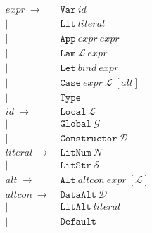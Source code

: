 \newcommand{\CVar}{\texttt{Var}}
\newcommand{\CLit}{\texttt{Lit}}
\newcommand{\CApp}{\texttt{App}}
\newcommand{\CLam}{\texttt{Lam}}
\newcommand{\CLet}{\texttt{Let}}
\newcommand{\CCase}{\texttt{Case}}
\newcommand{\CType}{\texttt{Type}}
\newcommand{\CLocal}{\texttt{Local}}
\newcommand{\CGlobal}{\texttt{Global}}
\newcommand{\CConstructor}{\texttt{Constructor}}
\newcommand{\CLitNum}{\texttt{LitNum}}
\newcommand{\CLitStr}{\texttt{LitStr}}
\newcommand{\CAlt}{\texttt{Alt}}
\newcommand{\CDataAlt}{\texttt{DataAlt}}
\newcommand{\CLitAlt}{\texttt{LitAlt}}
\newcommand{\CDefault}{\texttt{Default}}
\newcommand{\CNonRec}{\texttt{NonRec}}
\newcommand{\CRec}{\texttt{Rec}}
\newcommand{\CBind}{\texttt{Bind}}

\begin{figure}
  \begin{equation*}
    \begin{split}
      expr\    \rightarrow\ & \CVar\ id                          \\
                         |\ & \CLit\ literal                     \\
                         |\ & \CApp\ expr\ expr                  \\
                         |\ & \CLam\ \mathcal{L}\ expr           \\
                         |\ & \CLet\ bind\ expr                  \\
                         |\ & \CCase\ expr\ \mathcal{L}\ [alt]   \\
                         |\ & \CType                             \\
      id\      \rightarrow\ & \CLocal\       \mathcal{L}         \\
                         |\ & \CGlobal\      \mathcal{G}         \\
                         |\ & \CConstructor\ \mathcal{D}         \\
      literal\ \rightarrow\ & \CLitNum\ \mathcal{N}              \\
                         |\ & \CLitStr\ \mathcal{S}              \\
      alt\     \rightarrow\ & \CAlt\ altcon\ expr\ [\mathcal{L}] \\
      altcon\  \rightarrow\ & \CDataAlt\ \mathcal{D}             \\
                         |\ & \CLitAlt\ literal                  \\
                         |\ & \CDefault                          \\

\end{split}
\end{equation*}
\end{figure}
